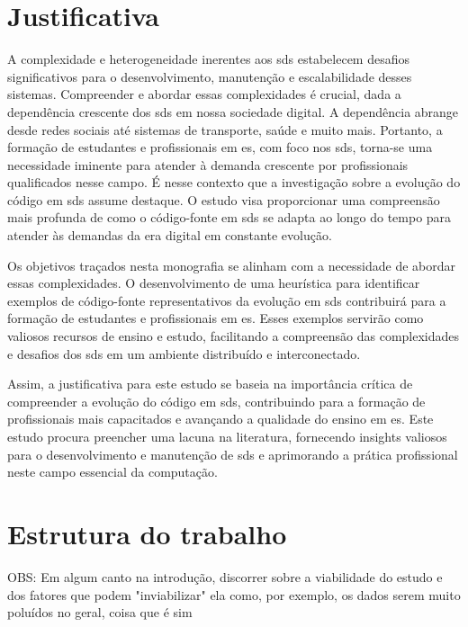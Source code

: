 \section{Justificativa}\label{sec:justificativa}
A complexidade e heterogeneidade inerentes aos \gls{sds} estabelecem desafios significativos para o desenvolvimento, manutenção e escalabilidade desses sistemas. Compreender e abordar essas complexidades é crucial, dada a dependência crescente dos \gls{sds} em nossa sociedade digital. A dependência abrange desde redes sociais até sistemas de transporte, saúde e muito mais. Portanto, a formação de estudantes e profissionais em \gls{es}, com foco nos \gls{sds}, torna-se uma necessidade iminente para atender à demanda crescente por profissionais qualificados nesse campo.
É nesse contexto que a investigação sobre a evolução do código em \gls{sds} assume destaque. O estudo visa proporcionar uma compreensão mais profunda de como o código-fonte em \gls{sds} se adapta ao longo do tempo para atender às demandas da era digital em constante evolução.

Os objetivos traçados nesta monografia se alinham com a necessidade de abordar essas complexidades. O desenvolvimento de uma heurística para identificar exemplos de código-fonte representativos da evolução em \gls{sds} contribuirá para a formação de estudantes e profissionais em \gls{es}. Esses exemplos servirão como valiosos recursos de ensino e estudo, facilitando a compreensão das complexidades e desafios dos \gls{sds} em um ambiente distribuído e interconectado.

Assim, a justificativa para este estudo se baseia na importância crítica de compreender a evolução do código em \gls{sds}, contribuindo para a formação de profissionais mais capacitados e avançando a qualidade do ensino em \gls{es}. Este estudo procura preencher uma lacuna na literatura, fornecendo insights valiosos para o desenvolvimento e manutenção de \gls{sds} e aprimorando a prática profissional neste campo essencial da computação.

\section{Estrutura do trabalho}\label{sec:estruturaTrabalho}

OBS: Em algum canto na introdução, discorrer sobre a viabilidade do estudo e dos fatores que podem "inviabilizar" ela como, por exemplo, os dados serem muito poluídos no geral, coisa que é sim